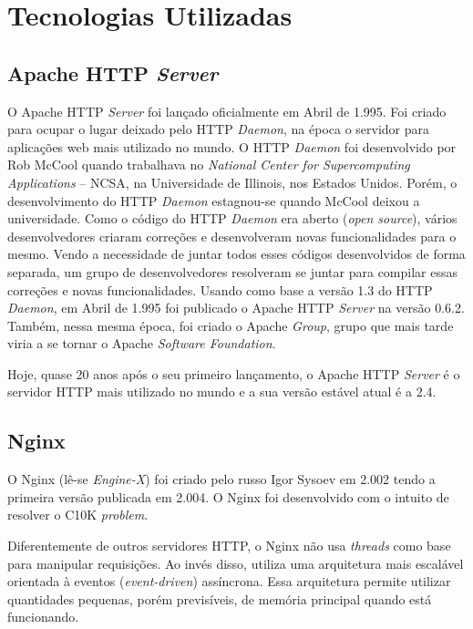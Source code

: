 \chapter{Tecnologias Utilizadas}\label{cap:tecnologias_utilizadas}

\section{Apache HTTP \textit{Server}}

O Apache HTTP \textit{Server} foi lançado oficialmente em Abril de 1.995. Foi 
criado para ocupar o lugar deixado pelo HTTP \textit{Daemon}, na época o 
servidor para aplicações web mais utilizado no mundo. O HTTP \textit{Daemon} 
foi desenvolvido por Rob McCool quando trabalhava no \textit{National Center 
for Supercomputing Applications} – NCSA, na Universidade de Illinois, nos 
Estados Unidos. Porém, o desenvolvimento do HTTP \textit{Daemon} estagnou-se 
quando McCool deixou a universidade. Como o código do HTTP \textit{Daemon} era 
aberto (\textit{open source}), vários desenvolvedores criaram correções e 
desenvolveram novas funcionalidades para o mesmo. Vendo a necessidade de juntar 
todos esses códigos desenvolvidos de forma separada, um grupo de 
desenvolvedores resolveram se juntar para compilar essas correções e novas 
funcionalidades. Usando como base a versão 1.3 do HTTP \textit{Daemon}, em 
Abril de 1.995 foi publicado o Apache HTTP \textit{Server} na versão 0.6.2. 
Também, nessa mesma época, foi criado o Apache \textit{Group}, grupo que mais 
tarde viria a se tornar o Apache \textit{Software Foundation}.

Hoje, quase 20 anos após o seu primeiro lançamento, o Apache HTTP 
\textit{Server} é o servidor HTTP mais utilizado no mundo e a sua versão 
estável atual é a 2.4.

\section{Nginx}
O Nginx (lê-se \textit{Engine-X}) foi criado pelo russo Igor Sysoev em 2.002 
tendo a primeira versão publicada em 2.004. O Nginx foi desenvolvido com o 
intuito de resolver o C10K \textit{problem}.

Diferentemente de outros servidores HTTP, o Nginx não usa \textit{threads} como 
base para manipular requisições. Ao invés disso, utiliza uma arquitetura mais 
escalável orientada à eventos (\textit{event-driven}) assíncrona. Essa 
arquitetura permite utilizar quantidades pequenas, porém previsíveis, de 
memória principal quando está funcionando.


